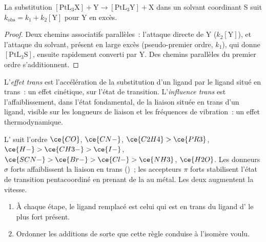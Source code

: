 \begin{proposition}\label{prop:b3:complex-mechanisms:square-planar}
La substitution $\mathrm{[PtL_3X] + Y \to [PtL_3Y] + X}$ dans un solvant coordinant S suit
$k_{\mathrm{obs}} = k_1 + k_2[\mathrm Y]$ pour Y en excès.
\end{proposition}

\begin{proof}
Deux chemins associatifs parallèles~: l'attaque directe de Y ($k_2[\mathrm Y]$), et
l'attaque du solvant, présent en large excès (pseudo-premier ordre, $k_1$),
qui donne $[\mathrm{PtL_3S}]$, ensuite rapidement converti par Y. Des chemins
parallèles du premier ordre s'additionnent.
\end{proof}

\begin{definition}\label{def:b3:complex-mechanisms:trans-effect}
L'\emph{effet trans} est l'accélération de la
substitution d'un ligand par le ligand situé en trans~: un effet cinétique,
sur l'état de transition. L'\emph{influence trans}
est l'affaiblissement, dans l'état fondamental, de la liaison située en
trans d'un ligand, visible sur les longueurs de liaison et les fréquences
de vibration~: un effet thermodynamique.
\end{definition}

L' suit l'ordre $\ce{CO}$, $\ce{CN-}$, $\ce{C2H4} > \ce{PR3}$, $\ce{H-} > \ce{CH3-} > \ce{I-}$, $\ce{SCN-} >
\ce{Br-} > \ce{Cl-} > \ce{NH3}$, $\ce{H2O}$. Les donneurs $\sigma$ forts
affaiblissent la liaison en trans ()~; les accepteurs $\pi$
forts stabilisent l'état de transition pentacoordiné en prenant de la
 au métal. Les deux augmentent la vitesse.

\begin{method}\label{met:b3:complex-mechanisms:pt-synthesis}
\begin{enumerate}
  \item À chaque étape, le ligand remplacé est celui qui est en trans du
        ligand d' le plus fort présent.
  \item Ordonner les additions de sorte que cette règle conduise à
        l'isomère voulu.
\end{enumerate}
\end{method}

